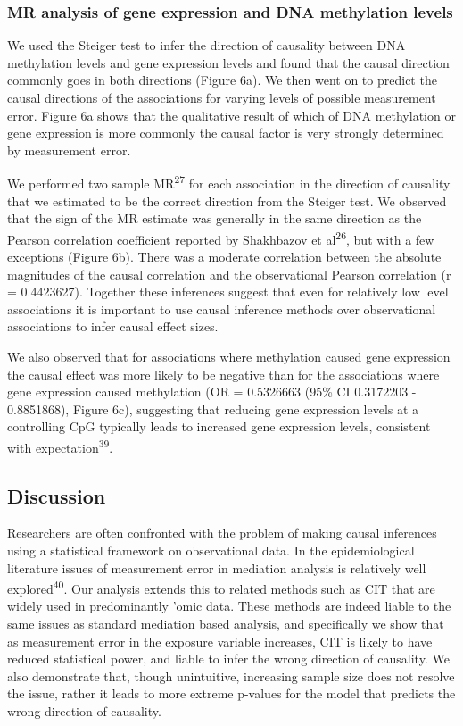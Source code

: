 \documentclass[]{article}
\begin{document}
\subsubsection{MR analysis of gene expression and DNA methylation
levels}\label{mr-analysis-of-gene-expression-and-dna-methylation-levels}

We used the Steiger test to infer the direction of causality between DNA
methylation levels and gene expression levels and found that the causal
direction commonly goes in both directions (Figure 6a). We then went on
to predict the causal directions of the associations for varying levels
of possible measurement error. Figure 6a shows that the qualitative
result of which of DNA methylation or gene expression is more commonly
the causal factor is very strongly determined by measurement error.

We performed two sample MR\textsuperscript{27} for each association in
the direction of causality that we estimated to be the correct direction
from the Steiger test. We observed that the sign of the MR estimate was
generally in the same direction as the Pearson correlation coefficient
reported by Shakhbazov et al\textsuperscript{26}, but with a few
exceptions (Figure 6b). There was a moderate correlation between the
absolute magnitudes of the causal correlation and the observational
Pearson correlation (r = 0.4423627). Together these inferences suggest
that even for relatively low level associations it is important to use
causal inference methods over observational associations to infer causal
effect sizes.

We also observed that for associations where methylation caused gene
expression the causal effect was more likely to be negative than for the
associations where gene expression caused methylation (OR = 0.5326663
(95\% CI 0.3172203 - 0.8851868), Figure 6c), suggesting that reducing
gene expression levels at a controlling CpG typically leads to increased
gene expression levels, consistent with expectation\textsuperscript{39}.

\subsection{Discussion}\label{discussion}

Researchers are often confronted with the problem of making causal
inferences using a statistical framework on observational data. In the
epidemiological literature issues of measurement error in mediation
analysis is relatively well explored\textsuperscript{40}. Our analysis
extends this to related methods such as CIT that are widely used in
predominantly 'omic data. These methods are indeed liable to the same
issues as standard mediation based analysis, and specifically we show
that as measurement error in the exposure variable increases, CIT is
likely to have reduced statistical power, and liable to infer the wrong
direction of causality. We also demonstrate that, though unintuitive,
increasing sample size does not resolve the issue, rather it leads to
more extreme p-values for the model that predicts the wrong direction of
causality.
\end{document}
